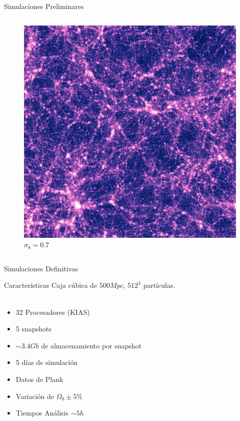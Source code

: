 \documentclass{beamer}
\begin{document}
\begin{frame}{Simulaciones Preliminares}
\begin{columns}
		\begin{column}{0.5\textwidth}
			\begin{figure}[!h]
			\begin{center}
				\includegraphics[width=\textwidth]{im/res2.png}
				\caption{$\sigma_8=0.7$} 
				\label{fig:res2}
			\end{center}
		\end{figure}
		\end{column}
	\end{columns}
\end{frame}
\begin{frame}{Simulaciones Definitivas}
	\begin{block}{Características}
		Caja cúbica de $500 Mpc$, $512^3$ partículas.\\~\\
		\begin{itemize}
			\item 32 Procesadores (KIAS)
			\item 5 snapshots
			\item $\sim 3.4Gb$ de almacenamiento por snapshot
			\item 5 días de simulación
			\item Datos de Plank
			\item Variación de $\Omega_0\pm5\%$
			\item Tiempos Análisis $\sim 5h$
		\end{itemize}
	\end{block}		
	
\end{frame}
\end{document}

